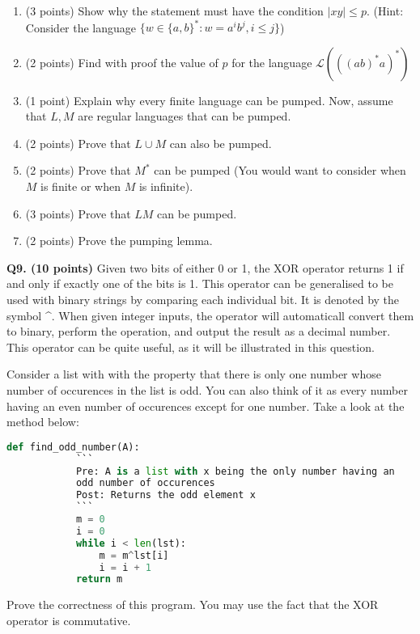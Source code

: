 \documentclass{article}
\begin{document}
    \begin{enumerate}[label=\alph*)]
        \item (3 points) Show why the statement must have the condition \(|xy| \leq p\). (Hint: Consider the language \(\{w \in \{a, b\}^* : w = a^i b^j , i \leq j\}\))
        \vfill
        \item (2 points) Find with proof the value of \(p\) for the language \(\mathcal{L}(((ab)^*a)^*)\) 
        \vfill
        \item (1 point) Explain why every finite language can be pumped.
        \vfill
        \pagebreak
        Now, assume that \(L,M\) are regular languages that can be pumped.
        
        \item (2 points) Prove that \(L \cup M\) can also be pumped.
        \vfill
        \item (2 points) Prove that \(M^*\) can be pumped (You would want to consider when \(M\) is finite or when \(M\) is infinite).
        \vfill
        \pagebreak
        \item (3 points) Prove that \(LM\) can be pumped.
        \vfill
        \item (2 points) Prove the pumping lemma.
        \vfill
    \end{enumerate}

    \pagebreak

    \textbf{Q9. (10 points)} Given two bits of either 0 or 1, the XOR operator returns 1 if and only if exactly one of the bits is 1. This operator can be generalised to be used with binary strings by comparing each individual bit. It is denoted by the symbol \^{}. When given integer inputs, the operator will automaticall convert them to binary, perform the operation, and output the result as a decimal number. This operator can be quite useful, as it will be illustrated in this question.

    Consider a list with with the property that there is only one number whose number of occurences in the list is odd. You can also think of it as every number having an even number of occurences except for one number. Take a look at the method below:

    \begin{lstlisting}[language=Python]
        def find_odd_number(A):
            ```
            Pre: A is a list with x being the only number having an
            odd number of occurences
            Post: Returns the odd element x
            ```
            m = 0
            i = 0
            while i < len(lst):
                m = m^lst[i]
                i = i + 1
            return m
    \end{lstlisting}

    \noindent Prove the correctness of this program. You may use the fact that the XOR operator is commutative.
    \vfill
\end{document}
